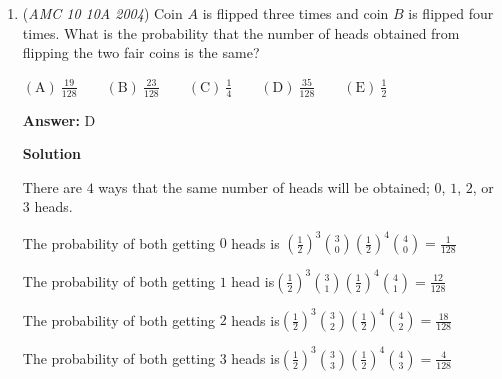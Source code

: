 \begin{enumerate}
 $[\triangle BAE] = 0.5 \cdot 4 \cdot 8 = 16$
$[\triangle ABC] = 0.5 \cdot 4 \cdot 16 = 12$
$[\triangle BDC] - [\triangle ADE] = 16 - 12 =\boxed{\mathrm{(B)}\ 4}$




\textbf{Solution 6}

Looking at the diagram, here are the following observations:

 \begin{verbatim}
- Both have the same angles to the right and left of point D.- Line AE is perpendicular to AB, and so is BC perpendicular to AB, so AE and BC are parallel.- We see that triangle ADE is proportional, given that both widths are 4.
\end{verbatim}

The area of triangle BAE - triangle ABC = 4, and triangle ABD cancels out. Leaving the answer, d = 4.

 -By Thiagu Kannan

 Education, the Study of Everything

 


 


	\item (\textit{AMC 10 10A 2004}) Coin $A$ is flipped three times and coin $B$ is flipped four times.  What is the probability that the number of heads obtained from flipping the two fair coins is the same?


 $\mathrm{(A) \ } \frac{19}{128} \qquad \mathrm{(B) \ } \frac{23}{128} \qquad \mathrm{(C) \ } \frac14 \qquad \mathrm{(D) \ } \frac{35}{128} \qquad \mathrm{(E) \ } \frac12$

 \textbf{Answer: }D



\textbf{Solution}

There are $4$ ways that the same number of heads will be obtained; $0$, $1$, $2$, or $3$ heads.

 The probability of both getting $0$ heads is $\left(\frac12\right)^3{3\choose0}\left(\frac12\right)^4{4\choose0}=\frac1{128}$

 The probability of both getting $1$ head is$\left(\frac12\right)^3{3\choose1}\left(\frac12\right)^4{4\choose1}=\frac{12}{128}$

 The probability of both getting $2$ heads is$\left(\frac12\right)^3{3\choose2}\left(\frac12\right)^4{4\choose2}=\frac{18}{128}$

 The probability of both getting $3$ heads is$\left(\frac12\right)^3{3\choose3}\left(\frac12\right)^4{4\choose3}=\frac{4}{128}$


\end{enumerate}
